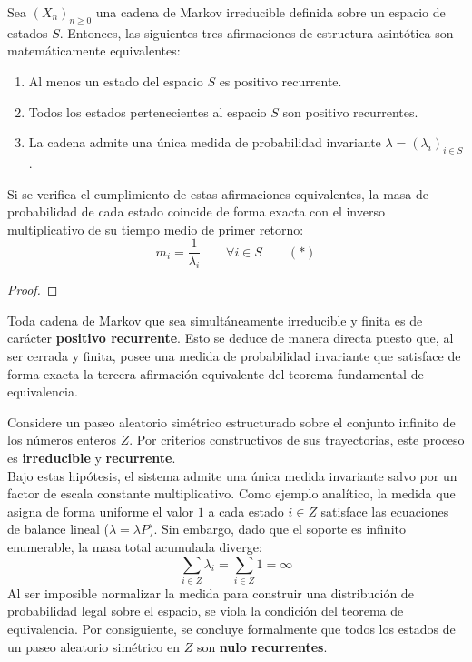 \begin{teo}
    Sea $(X_n)_{n \geq 0}$ una cadena de Markov irreducible definida sobre un espacio de estados $S$. Entonces, las siguientes tres afirmaciones de estructura asintótica son matemáticamente equivalentes:
    \begin{enumerate}
        \item Al menos un estado del espacio $S$ es positivo recurrente.
        \item Todos los estados pertenecientes al espacio $S$ son positivo recurrentes.
        \item La cadena admite una única medida de probabilidad invariante $\lambda = (\lambda_i)_{i \in S}$.
    \end{enumerate}
    Si se verifica el cumplimiento de estas afirmaciones equivalentes, la masa de probabilidad de cada estado coincide de forma exacta con el inverso multiplicativo de su tiempo medio de primer retorno:
    \[
    m_i = \frac{1}{\lambda_i} \qquad \forall i \in S \qquad (*)
    \]
\begin{proof}
\end{proof}
\end{teo}

\begin{observacion}
    Toda cadena de Markov que sea simultáneamente irreducible y finita es de carácter \textbf{positivo recurrente}. Esto se deduce de manera directa puesto que, al ser cerrada y finita, posee una medida de probabilidad invariante que satisface de forma exacta la tercera afirmación equivalente del teorema fundamental de equivalencia.
\end{observacion}

\begin{observacion}
    Considere un paseo aleatorio simétrico estructurado sobre el conjunto infinito de los números enteros $Z$. Por criterios constructivos de sus trayectorias, este proceso es \textbf{irreducible} y \textbf{recurrente}.  \\

    \noindent
    Bajo estas hipótesis, el sistema admite una única medida invariante salvo por un factor de escala constante multiplicativo. Como ejemplo analítico, la medida que asigna de forma uniforme el valor $1$ a cada estado $i \in Z$ satisface las ecuaciones de balance lineal ($\lambda = \lambda P$). Sin embargo, dado que el soporte es infinito enumerable, la masa total acumulada diverge:
    \[
    \sum_{i \in Z} \lambda_i = \sum_{i \in Z} 1 = \infty
    \]
    Al ser imposible normalizar la medida para construir una distribución de probabilidad legal sobre el espacio, se viola la condición del teorema de equivalencia. Por consiguiente, se concluye formalmente que todos los estados de un paseo aleatorio simétrico en $Z$ son \textbf{nulo recurrentes}.
\end{observacion}


